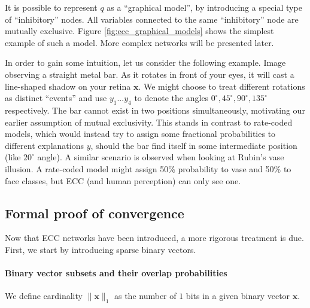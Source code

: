 \documentclass[12pt]{article}
\begin{document}
It is possible to represent $q$ as a ``graphical model'', by introducing a special type of ``inhibitory'' nodes. All variables connected to the same ``inhibitory'' node are mutually exclusive. Figure \ref{fig:ecc_graphical_models} shows the simplest example of such a model. More complex networks will be presented later.

In order to gain some intuition, let us consider the following example. Image observing a straight metal bar. As it rotates in front of your eyes, it will cast a line-shaped shadow on your retina $\boldsymbol{x}$. We might choose to treat different  rotations as distinct ``events'' and use $y_1...y_4$ to denote the angles $0^{\circ},45^{\circ},90^{\circ},135^{\circ}$ respectively. The bar cannot exist in two positions simultaneously, motivating our earlier assumption of mutual exclusivity. This stands in contrast to rate-coded models, which would instead try to assign some fractional probabilities to different explanations $y$, should the bar find itself in some intermediate position (like $20^\circ$ angle). A similar scenario is observed when looking at Rubin's vase illusion. A rate-coded model might assign 50\% probability to vase and 50\% to face classes, but ECC (and human perception) can only see one.

\subsection{Formal proof of convergence}
Now that ECC networks have been introduced, a more rigorous treatment is due.
First, we start by introducing sparse binary vectors.

\paragraph{Binary vector subsets and their overlap probabilities} 

We define cardinality $\lVert\boldsymbol{x}\rVert_1$ as the number of $1$ bits in a given binary vector $\boldsymbol{x}$.
\end{document}
